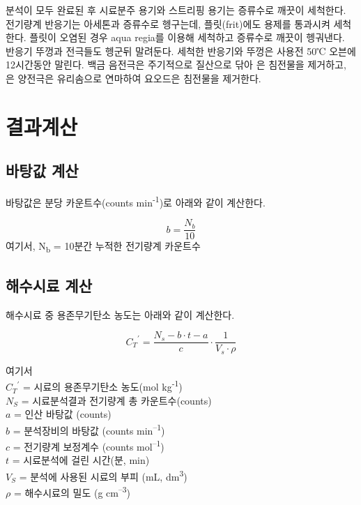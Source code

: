 \documentclass[
]{book}
\begin{document}
분석이 모두 완료된 후 시료분주 용기와 스트리핑 용기는 증류수로 깨끗이 세척한다. 전기량계 반응기는 아세톤과 증류수로 헹구는데, 플릿(frit)에도 용제를 통과시켜 세척한다. 플릿이 오염된 경우 aqua regia를 이용해 세척하고 증류수로 깨끗이 헹궈낸다. 반응기 뚜껑과 전극들도 헹군뒤 말려둔다. 세척한 반응기와 뚜껑은 사용전 50℃ 오븐에 12시간동안 말린다.
백금 음전극은 주기적으로 질산으로 닦아 은 침전물을 제거하고, 은 양전극은 유리솜으로 연마하여 요오드은 침전물을 제거한다.

\hypertarget{uxacb0uxacfcuxacc4uxc0b0}{%
\section{결과계산}\label{uxacb0uxacfcuxacc4uxc0b0}}

\hypertarget{uxbc14uxd0d5uxac12-uxacc4uxc0b0}{%
\subsection{바탕값 계산}\label{uxbc14uxd0d5uxac12-uxacc4uxc0b0}}

바탕값은 분당 카운트수(counts min\textsuperscript{-1})로 아래와 같이 계산한다.

\[b=\frac{N_b}{10}\]
여기서, N\textsubscript{b} = 10분간 누적한 전기량계 카운트수

\hypertarget{uxd574uxc218uxc2dcuxb8cc-uxacc4uxc0b0}{%
\subsection{해수시료 계산}\label{uxd574uxc218uxc2dcuxb8cc-uxacc4uxc0b0}}

해수시료 중 용존무기탄소 농도는 아래와 같이 계산한다.

\[{C_T}^{'} = \frac{N_s-b \cdot t-a}{c} \cdot \frac{1}{V_s \cdot ρ}\]

여기서\\
\({C_T}^{'}\) = 시료의 용존무기탄소 농도(mol kg\textsuperscript{-1})\\
\(N_S\) = 시료분석결과 전기량계 총 카운트수(counts)\\
\(a\) = 인산 바탕값 (counts)\\
\(b\) = 분석장비의 바탕값 (counts min\textsuperscript{--1})\\
\(c\) = 전기량계 보정계수 (counts mol\textsuperscript{--1})\\
\(t\) = 시료분석에 걸린 시간(분, min)\\
\(V_S\) = 분석에 사용된 시료의 부피 (mL, dm\textsuperscript{3})\\
\(ρ\) = 해수시료의 밀도 (g cm\textsuperscript{--3})
\end{document}

